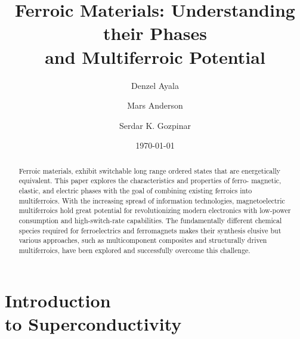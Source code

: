 \documentclass[
reprint,
amsmath,amssymb,
aps,
tikz,
border=5pt
]{revtex4-1}
\begin{document}

\title{Ferroic Materials: Understanding their Phases\\ and Multiferroic Potential}

\author{Denzel Ayala} 
\author{Mars Anderson}
\author{Serdar K. Gozpinar}

%


\date{\today}%

\begin{abstract}

  Ferroic materials, exhibit switchable long range ordered states that are energetically equivalent. This paper explores the characteristics and properties of ferro- magnetic, elastic, and electric phases with the goal of combining existing ferroics into multiferroics. With  the increasing spread of information technologies, magnetoelectric multiferroics hold great potential for revolutionizing modern electronics with low-power consumption and high-switch-rate capabilities. The fundamentally different chemical species required for ferroelectrics and ferromagnets makes their synthesis elusive but various approaches, such as multicomponent composites and structurally driven multiferroics, have been explored and successfully overcome this challenge.
\end{abstract}
\maketitle

\section*{\label{sec:intro}Introduction \\\lowercase{to} Superconductivity}

\lipsum
\begin{figure}[h]
  \begin{tikzpicture}
    \centering
    
  \end{tikzpicture}
\end{figure}
\lipsum
\end{document}
